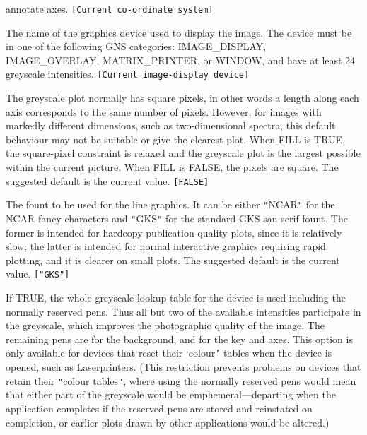 \documentclass[twoside,11pt]{article}
\newcommand{\sstsubsection}[1]{ \item[{#1}] \mbox{} \\}
\renewcommand{\sstsubsection}[1]{\item[{#1}]}
\begin{document}
{{{         annotate axes.  {\tt [Current co-ordinate system]}
      }
      \sstsubsection{
         DEVICE = DEVICE (Read)
      }{
         The name of the graphics device used to display the image.
         The device must be in one of the following GNS categories:
         IMAGE\_DISPLAY, IMAGE\_OVERLAY, MATRIX\_PRINTER, or WINDOW, and
         have at least 24 greyscale intensities.
         {\tt [Current image-display device]}
      }
      \sstsubsection{
         FILL = \_LOGICAL (Read)
      }{
         The greyscale plot normally has square pixels, in other words
         a length along each axis corresponds to the same number of
         pixels.  However, for images with markedly different
         dimensions, such as two-dimensional spectra, this default
         behaviour may not be suitable or give the clearest plot.  When
         FILL is TRUE, the square-pixel constraint is relaxed and the
         greyscale plot is the largest possible within the current
         picture.  When FILL is FALSE, the pixels are square.  The
         suggested default is the current value.  {\tt [FALSE]}
      }
      \sstsubsection{
         FONT = LITERAL (Read)
      }{
         The fount to be used for the line graphics.  It can be either
         {\tt "}NCAR{\tt "} for the NCAR fancy characters and {\tt "}GKS{\tt "} for the standard
         GKS san-serif fount.   The former is intended for hardcopy
         publication-quality plots, since it is relatively slow; the
         latter is intended for normal interactive graphics requiring
         rapid plotting, and it is clearer on small plots. The
         suggested default is the current value. {\tt [{\tt "}GKS{\tt "}]}
      }
      \sstsubsection{
         FULL = \_LOGICAL (Read)
      }{
         If TRUE, the whole greyscale lookup table for the device is
         used including the normally reserved pens.  Thus all but two
         of the available intensities participate in the greyscale,
         which improves the photographic quality of the image.  The
         remaining pens are for the background, and for the key and
         axes.  This option is only available for devices that reset
         their `colour{\tt '} tables when the device is opened, such as
         Laserprinters. (This restriction prevents problems on devices
         that retain their {\tt "}colour tables{\tt "}, where using the normally
         reserved pens would mean that either part of the greyscale
         would be emphemeral---departing when the application
         completes if the reserved pens are stored and reinstated on
         completion, or earlier plots drawn by other applications would
         be altered.)

}}}
\end{document}
